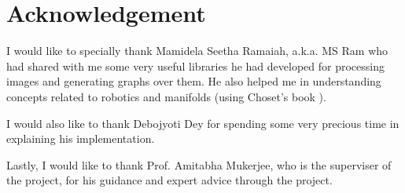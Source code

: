 \documentclass[12pt]{article}
\begin{document}
% 
% 

 

\section{Acknowledgement}
I would like to specially thank Mamidela Seetha Ramaiah, a.k.a. MS Ram who had shared with me some very useful libraries he had developed for processing images and generating graphs over them. He also helped me in understanding concepts related to robotics and manifolds (using Choset's book \cite{choset}).

I would also like to thank Debojyoti Dey for spending some very precious time in explaining his implementation.

Lastly, I would like to thank Prof. Amitabha Mukerjee, who is the superviser of the project, for his guidance and expert advice through the project.
\end{document}
